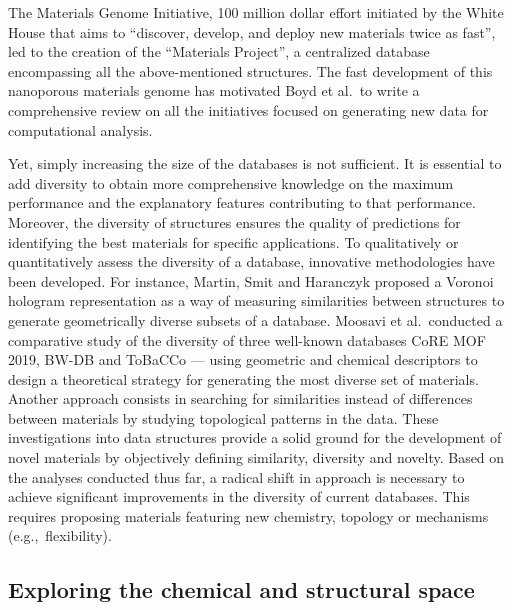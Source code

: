 \documentclass[main.tex]{subfiles}
\begin{document}
The Materials Genome Initiative, 100 million dollar effort initiated by the White House that aims to ``discover, develop, and deploy new materials twice as fast'', led to the creation of the ``Materials Project'', a centralized database encompassing all the above-mentioned structures.\autocite{kalil2011national,Matgenome,Jain_2013}
The fast development of this nanoporous materials genome has motivated Boyd et al.\ to write a comprehensive review on all the initiatives focused on generating new data for computational analysis.\autocite{Boyd_2017}

Yet, simply increasing the size of the databases is not sufficient. It is essential to add diversity to obtain more comprehensive knowledge on the maximum performance and the explanatory features contributing to that performance. Moreover, the diversity of structures ensures the quality of predictions for identifying the best materials for specific applications. To qualitatively or quantitatively assess the diversity of a database, innovative methodologies have been developed. For instance, Martin, Smit and Haranczyk proposed a Voronoi hologram representation as a way of measuring similarities between structures to generate geometrically diverse subsets of a database.\autocite{Martin_2011} Moosavi et al.\ conducted a comparative study of the diversity of three well-known databases CoRE MOF 2019,\autocite{Chung_2019} BW-DB\autocite{Boyd_2016} and ToBaCCo\autocite{Gomez_Gualdron_2016, Colon_2017} --- using geometric and chemical descriptors to design a theoretical strategy for generating the most diverse set of materials.\autocite{Moosavi_2020} Another approach consists in searching for similarities instead of differences between materials by studying topological patterns in the data.\autocite{Lee_2017} These investigations into data structures provide a solid ground for the development of novel materials by objectively defining similarity, diversity and novelty. Based on the analyses conducted thus far, a radical shift in approach is necessary to achieve significant improvements in the diversity of current databases. This requires proposing materials featuring new chemistry, topology or mechanisms (e.g.,\ flexibility).


\subsection{Exploring the chemical and structural space}
\end{document}

